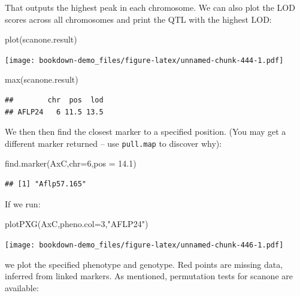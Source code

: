 \documentclass[
]{book}
\newenvironment{Shaded}{\begin{snugshade}}{\end{snugshade}}
\newcommand{\AttributeTok}[1]{\textcolor[rgb]{0.77,0.63,0.00}{#1}}
\newcommand{\DecValTok}[1]{\textcolor[rgb]{0.00,0.00,0.81}{#1}}
\newcommand{\FloatTok}[1]{\textcolor[rgb]{0.00,0.00,0.81}{#1}}
\newcommand{\FunctionTok}[1]{\textcolor[rgb]{0.00,0.00,0.00}{#1}}
\newcommand{\NormalTok}[1]{#1}
\newcommand{\StringTok}[1]{\textcolor[rgb]{0.31,0.60,0.02}{#1}}
\begin{document}
That outputs the highest peak in each chromosome. We can also plot the LOD scores across all chromosomes and print the QTL with the highest LOD:

\begin{Shaded}
\begin{Highlighting}[]
\FunctionTok{plot}\NormalTok{(scanone.result) }
\end{Highlighting}
\end{Shaded}

\texttt{[image: bookdown-demo\_files/figure-latex/unnamed-chunk-444-1.pdf]}

\begin{Shaded}
\begin{Highlighting}[]
\FunctionTok{max}\NormalTok{(scanone.result) }
\end{Highlighting}
\end{Shaded}

\begin{verbatim}
##        chr  pos  lod
## AFLP24   6 11.5 13.5
\end{verbatim}

We then then find the closest marker to a specified position. (You may get a different marker returned -- use \texttt{pull.map} to discover why):

\begin{Shaded}
\begin{Highlighting}[]
\FunctionTok{find.marker}\NormalTok{(AxC,}\AttributeTok{chr=}\DecValTok{6}\NormalTok{,}\AttributeTok{pos =} \FloatTok{14.1}\NormalTok{) }
\end{Highlighting}
\end{Shaded}

\begin{verbatim}
## [1] "Aflp57.165"
\end{verbatim}

If we run:

\begin{Shaded}
\begin{Highlighting}[]
\FunctionTok{plotPXG}\NormalTok{(AxC,}\AttributeTok{pheno.col=}\DecValTok{3}\NormalTok{,}\StringTok{"AFLP24"}\NormalTok{) }
\end{Highlighting}
\end{Shaded}

\texttt{[image: bookdown-demo\_files/figure-latex/unnamed-chunk-446-1.pdf]}

we plot the specified phenotype and genotype. Red points are missing data, inferred from linked markers. As mentioned, permutation tests for scanone are available:
\end{document}
